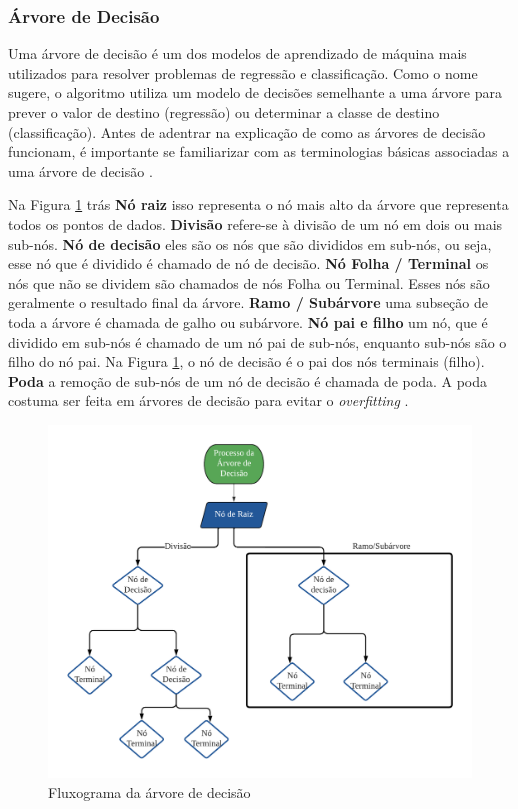  
 \subsubsection{\'Arvore de Decis\~ao }
 
 
 Uma árvore de decisão é um dos modelos de aprendizado de máquina mais utilizados para resolver problemas de regressão e classificação. Como o nome sugere, o algoritmo utiliza um modelo de decisões semelhante a uma árvore para prever o valor de destino (regressão) ou determinar a classe de destino (classificação). Antes de adentrar na explicação de como as árvores de decisão funcionam, é importante se familiarizar com as terminologias básicas associadas a uma árvore de decisão \cite{decision}.
 
 Na Figura \ref{fig:decison} trás \textbf{Nó raiz} isso representa o nó mais alto da árvore que representa todos os pontos de dados.
 \textbf{Divisão} refere-se à divisão de um nó em dois ou mais sub-nós.
 \textbf{Nó de decisão} eles são os nós que são divididos em sub-nós, ou seja, esse nó que é dividido é chamado de nó de decisão.
 \textbf{Nó Folha / Terminal} os nós que não se dividem são chamados de nós Folha ou Terminal. Esses nós são geralmente o resultado final da árvore.
 \textbf{Ramo / Subárvore} uma subseção de toda a árvore é chamada de galho ou subárvore.
 \textbf{Nó pai e filho} um nó, que é dividido em sub-nós é chamado de um nó pai de sub-nós, enquanto sub-nós são o filho do nó pai. Na Figura \ref{fig:decison}, o nó de decisão é o pai dos nós terminais (filho).
 \textbf{Poda} a remoção de sub-nós de um nó de decisão é chamada de poda. A poda costuma ser feita em árvores de decisão para evitar o \textit{overfitting}  \cite{decision}.
 
 \begin{figure}[H]
 	\centering
 	\caption{Fluxograma da árvore de decisão}
 	\label{fig:decison}
 	\includegraphics[width=0.7\linewidth]{Modelos/Figuras/decison}
 	
 \end{figure}
 
